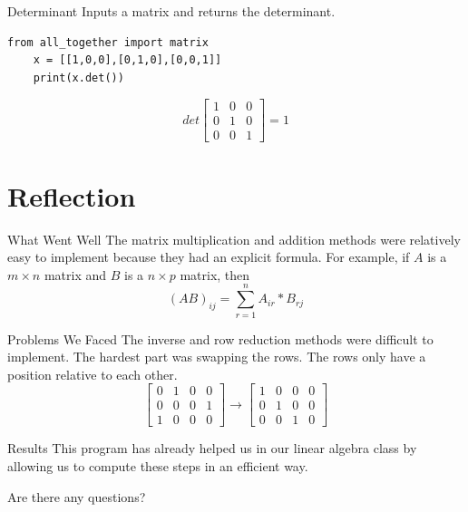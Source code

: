 \documentclass{beamer}
\begin{document}
\begin{frame}[fragile = singleslide]{Determinant}
    Inputs a matrix and returns the determinant. 
\begin{verbatim}
from all_together import matrix    
    x = [[1,0,0],[0,1,0],[0,0,1]]
    print(x.det()) 
\end{verbatim}
\begin{equation*}
    det \left[
    \begin{array}{ccc}
        1 & 0 &0 \\
        0 &1&0 \\
        0&0&1 
    \end{array}
    \right] = 1
\end{equation*}
\end{frame}


\section{Reflection}
\begin{frame}{What Went Well}
    The matrix multiplication and addition methods were relatively easy to implement because they had an explicit formula. For example, if \(A\) is a \(m \times n\) matrix and \(B\) is a \(n \times p\) matrix, then
    \begin{equation}
        (AB)_{ij} = \sum^{n}_{r=1}A_{ir}*B_{rj}
    \end{equation}
\end{frame}

\begin{frame}{Problems We Faced}
    The inverse and row reduction methods were difficult to implement. The hardest part was swapping the rows. The rows only have a position relative to each other. 
    \begin{equation*}
    \left[
        \begin{array}{cccc}
            0 & 1&0&0  \\
            0 & 0&0&1 \\
            1&0&0&0
        \end{array}
    \right]
    \rightarrow
    \left[
    \begin{array}{cccc}
        1 &0&0&0  \\
         0&1&0&0\\
         0&0&1&0
    \end{array}
    \right]
    \end{equation*}
\end{frame}

\begin{frame}{Results}
    This program has already helped us in our linear algebra class by allowing us to compute these steps in an efficient way. \pause
\begin{center}
    Are there any questions?
\end{center}

\end{frame}
\end{document}
